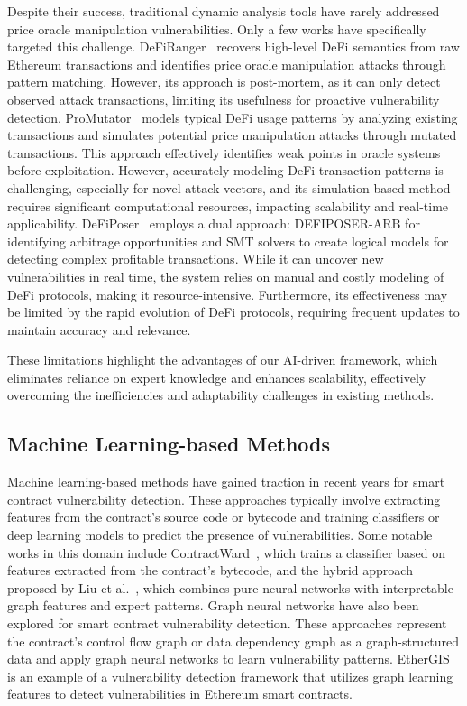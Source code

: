 Despite their success, traditional dynamic analysis tools have rarely addressed price oracle manipulation vulnerabilities. Only a few works have specifically targeted this challenge.
DeFiRanger~\cite{wu2021defiranger} recovers high-level DeFi semantics from raw Ethereum transactions and identifies price oracle manipulation attacks through pattern matching. However, its approach is post-mortem, as it can only detect observed attack transactions, limiting its usefulness for proactive vulnerability detection.
ProMutator~\cite{wang2021promutator} models typical DeFi usage patterns by analyzing existing transactions and simulates potential price manipulation attacks through mutated transactions. This approach effectively identifies weak points in oracle systems before exploitation. However, accurately modeling DeFi transaction patterns is challenging, especially for novel attack vectors, and its simulation-based method requires significant computational resources, impacting scalability and real-time applicability.
DeFiPoser~\cite{zhou2021defiposer} employs a dual approach: DEFIPOSER-ARB for identifying arbitrage opportunities and SMT solvers to create logical models for detecting complex profitable transactions. While it can uncover new vulnerabilities in real time, the system relies on manual and costly modeling of DeFi protocols, making it resource-intensive. Furthermore, its effectiveness may be limited by the rapid evolution of DeFi protocols, requiring frequent updates to maintain accuracy and relevance.

These limitations highlight the advantages of our AI-driven framework, which eliminates reliance on expert knowledge and enhances scalability, effectively 
overcoming the inefficiencies and adaptability challenges in existing 
methods.

\subsection{Machine Learning-based Methods} \label{Machine Learning-based Methods}
Machine learning-based methods have gained traction in recent years for smart contract vulnerability detection. These approaches typically involve extracting features from the contract's source code or bytecode and training classifiers or deep learning models to predict the presence of vulnerabilities. Some notable works in this domain include ContractWard~\cite{wang2020contractward}, which trains a classifier based on features extracted from the contract's bytecode, and the hybrid approach proposed by Liu et al.~\cite{liu2021combining}, which combines pure neural networks with interpretable graph features and expert patterns.
Graph neural networks have also been explored for smart contract vulnerability detection. These approaches represent the contract's control flow graph or data dependency graph as a graph-structured data and apply graph neural networks to learn vulnerability patterns. EtherGIS~\cite{zeng2022ethergis} is an example of a vulnerability detection framework that utilizes graph learning features to detect vulnerabilities in Ethereum smart contracts.

